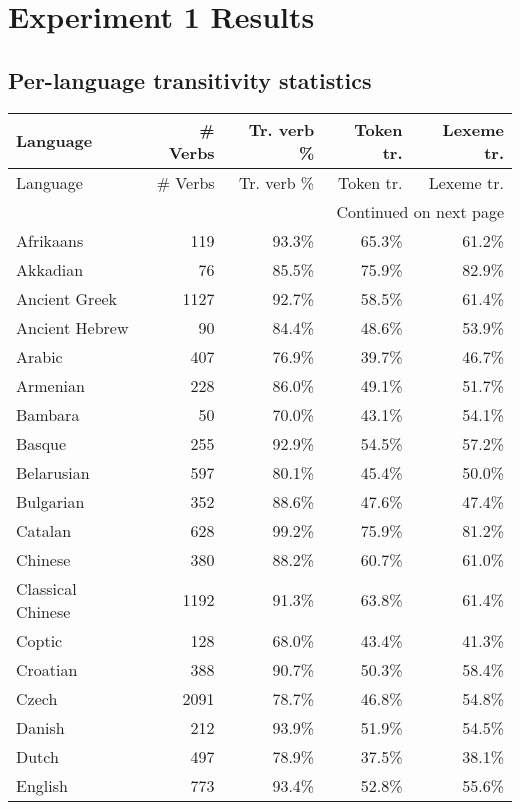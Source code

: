 \chapter{Experiment 1 Results}\label{appendix:exp1}
\section{Per-language transitivity statistics}
\begin{longtable}{lrrrr}
    \toprule
    Language & \# Verbs & Tr. verb \% & Token tr. & Lexeme tr. \\
    \midrule
    \endfirsthead
    \toprule
    Language & \# Verbs & Tr. verb \% & Token tr. & Lexeme tr. \\
    \midrule
    \endhead
    \midrule
    \multicolumn{5}{r}{Continued on next page} \\
    \midrule
    \endfoot
    \bottomrule
    \endlastfoot
    Afrikaans & 119 & 93.3\% & 65.3\% & 61.2\% \\
    Akkadian & 76 & 85.5\% & 75.9\% & 82.9\% \\
    Ancient Greek & 1127 & 92.7\% & 58.5\% & 61.4\% \\
    Ancient Hebrew & 90 & 84.4\% & 48.6\% & 53.9\% \\
    Arabic & 407 & 76.9\% & 39.7\% & 46.7\% \\
    Armenian & 228 & 86.0\% & 49.1\% & 51.7\% \\
    Bambara & 50 & 70.0\% & 43.1\% & 54.1\% \\
    Basque & 255 & 92.9\% & 54.5\% & 57.2\% \\
    Belarusian & 597 & 80.1\% & 45.4\% & 50.0\% \\
    Bulgarian & 352 & 88.6\% & 47.6\% & 47.4\% \\
    Catalan & 628 & 99.2\% & 75.9\% & 81.2\% \\
    Chinese & 380 & 88.2\% & 60.7\% & 61.0\% \\
    Classical Chinese & 1192 & 91.3\% & 63.8\% & 61.4\% \\
    Coptic & 128 & 68.0\% & 43.4\% & 41.3\% \\
    Croatian & 388 & 90.7\% & 50.3\% & 58.4\% \\
    Czech & 2091 & 78.7\% & 46.8\% & 54.8\% \\
    Danish & 212 & 93.9\% & 51.9\% & 54.5\% \\
    Dutch & 497 & 78.9\% & 37.5\% & 38.1\% \\
    English & 773 & 93.4\% & 52.8\% & 55.6\% \\

\end{longtable}
